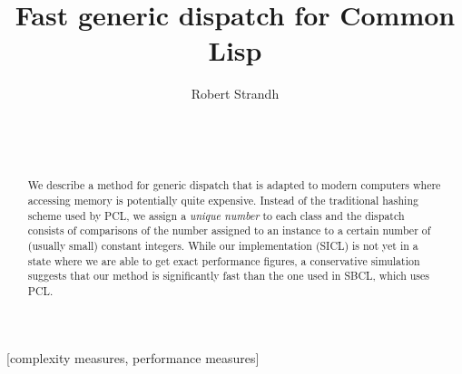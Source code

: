\documentclass{acm_proc_article-sp}
\def\inputtex#1{}
\begin{document}
\title{Fast generic dispatch for Common Lisp}
\author{\alignauthor
Robert Strandh\\
\\
\\
\\
}

\maketitle

\begin{abstract}
We describe a method for generic dispatch that is adapted to modern
computers where accessing memory is potentially quite expensive.
Instead of the traditional hashing scheme used by PCL, we assign a
\emph{unique number} to each class and the dispatch consists of
comparisons of the number assigned to an instance to a certain number
of (usually small) constant integers.  While our implementation (SICL)
is not yet in a state where we are able to get exact performance
figures, a conservative simulation suggests that our method is
significantly fast than the one used in SBCL, which uses PCL.
\end{abstract}

[complexity measures, performance measures]

\inputtex{sec-introduction.tex}
\inputtex{sec-previous.tex}
\inputtex{sec-our-method.tex}
\inputtex{sec-performance.tex}
\inputtex{sec-conclusions.tex}



\end{document}
